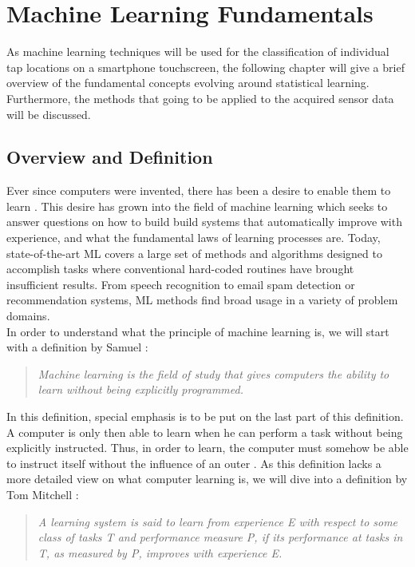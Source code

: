 \chapter{Machine Learning Fundamentals}
As machine learning techniques will be used for the classification of individual tap locations on a smartphone touchscreen, the following chapter will give a brief overview of the fundamental concepts evolving around statistical learning. Furthermore, the methods that going to be applied to the acquired sensor data will be discussed.

\section{Overview and Definition}

Ever since computers were invented, there has been a desire to enable them to learn \cite{samuel2000some}. This desire has grown into the field of machine learning which seeks to answer questions on how to build build systems that automatically improve with experience, and what the fundamental laws of learning processes are. Today, state-of-the-art ML covers a large set of methods and algorithms designed to accomplish tasks where conventional hard-coded routines have brought insufficient results. From speech recognition to email spam detection or recommendation systems, ML methods find broad usage in a variety of problem domains. \\

In order to understand what the principle of machine learning is, we will start with a definition by Samuel \cite{samuel2000some}:\\
\begin{quote}
\textit{Machine learning is the field of study that gives computers the ability to learn without being explicitly programmed.}\\
\end{quote}

In this definition, special emphasis is to be put on the last part of this definition. A computer is only then able to learn when he can perform a task without being explicitly instructed. Thus, in order to learn, the computer must somehow be able to instruct itself without the influence of an outer . As this definition lacks a more detailed view on what computer learning is, we will dive into a definition by Tom Mitchell \cite{mitchell2006discipline}:\\
\begin{quote}
\textit{A learning system is said to learn from experience E with respect to some class of tasks T and performance measure P, if its performance at tasks in T, as measured by P, improves with experience E.}\\
\end{quote}

